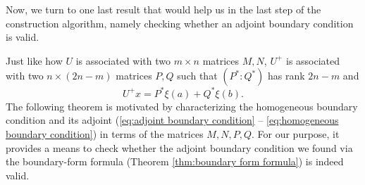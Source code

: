 \documentclass[12pt, oneside, a4paper]{article}
\begin{document}
Now, we turn to one last result that would help us in the last step of the construction algorithm, namely checking whether an adjoint boundary condition is valid.

Just like how $U$ is associated with two $m\times n$ matrices $M, N$, $U^+$ is associated with two $n\times (2n-m)$ matrices $P, Q$ such that $(P^*:Q^*)$ has rank $2n-m$ and
\begin{equation}\label{eq:U^+x in P* Q*}
    U^+x = P^*\xi(a) + Q^*\xi(b).
\end{equation}
The following theorem is motivated by characterizing the homogeneous boundary condition and its adjoint (\eqref{eq:adjoint boundary condition} -- \eqref{eq:homogeneous boundary condition}) in terms of the matrices $M, N, P, Q$. For our purpose, it provides a means to check whether the adjoint boundary condition we found via the boundary-form formula (Theorem \ref{thm:boundary form formula}) is indeed valid.
\end{document}
